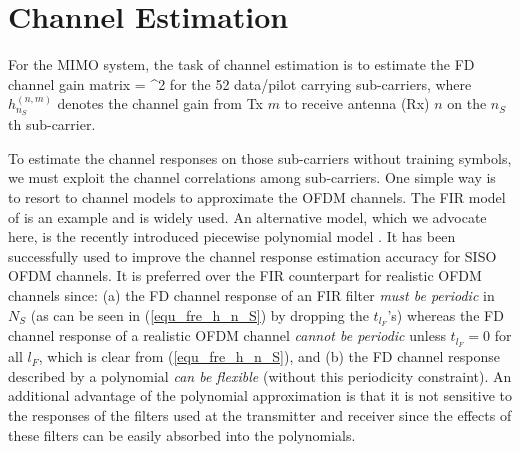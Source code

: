 \documentclass[11pt,draftnofoot,onecolumn]{IEEEtran}
\begin{document}
\section{Channel Estimation}
\label{sec3}

For the MIMO system, the task of channel estimation is to estimate
the FD channel gain matrix %
\ben {\Hbf} = \left [\ba{cc}
   {h}_{n_S}^{(1,1)} & {h}_{n_S}^{(1,2)} \\
   {h}_{n_S}^{(2,1)} & {h}_{n_S}^{(2,2)} \ea
   \right ] ^{2}
\label{eq_modelofh}
\een
for the 52 data/pilot carrying sub-carriers,
where ${h}_{n_S}^{(n,m)}$ denotes the channel
gain from Tx $m$ to receive antenna (Rx) $n$
on the $n_S$th sub-carrier.

To estimate the channel responses on those sub-carriers without training symbols,
we must exploit the channel correlations among sub-carriers.
One simple way is to resort to channel
models to approximate the OFDM channels. The FIR model of
\cite{LarssonLi2001,LiYe2002} is an example and is widely used.
An alternative model, which we advocate here, is the recently
introduced piecewise polynomial model \cite{WangLiu2002}.
It has been successfully used to improve the channel
response estimation accuracy for SISO OFDM channels.
It is preferred over the FIR counterpart
for realistic OFDM channels
since: (a) the FD channel response of an FIR filter {\em must be
periodic} in $N_S$ (as can be seen in (\ref{equ_fre_h_n_S})
by dropping the $t_{l_F}$'s) whereas
the FD channel response of a realistic OFDM channel
{\em cannot be periodic} unless $t_{l_F} = 0$ for all $l_F$,
which is clear from (\ref{equ_fre_h_n_S}),
and (b) the FD channel response described by a polynomial
{\em can be flexible} (without this periodicity constraint).
%
%
An additional advantage of the polynomial approximation is
that it is not sensitive to the responses of the filters used
at the transmitter and receiver since the effects of these filters
can be easily absorbed into the polynomials.
\end{document}
